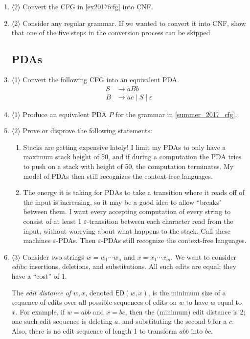 \documentclass[a4paper,american,12pt]{book}
\newcommand{\Level}[1]{{\color{blue} $\langle$#1$\rangle$}}
\begin{document}
\begin{enumerate}
\item \Level{2} Convert the CFG in \cref{ex2017fcfg} into CNF.

\item \Level{2} Consider any regular grammar. If we wanted to convert it into CNF, show that one of the five steps in the conversion process can be skipped.

\subsection{PDAs}

\item \label{ex2017fcfg} \Level{1}  Convert the following CFG into an equivalent PDA.
\begin{align*}
S &\to aBb\\
B &\to ac \;|\;S\;|\;\varepsilon
\end{align*}


\item \Level{1} Produce an equivalent PDA $P$ for the grammar in \cref{summer_2017_cfg}.

\item \Level{2} Prove or disprove the following statements:
\begin{enumerate}
	\item Stacks are getting expensive lately! I limit my PDAs to only have a maximum stack height of 50, and if during a computation the PDA tries to push on a stack with height of 50, the computation terminates. My model of PDAs then still recognizes the context-free languages.
	\item The energy it is taking for PDAs to take a transition where it reads off of the input is increasing, so it may be a good idea to allow ``breaks" between them. I want every accepting computation of every string to consist of at least 1 $\varepsilon$-transition between each character read from the input, without worrying about what happens to the stack. Call these machines $\varepsilon$-PDAs. Then $\varepsilon$-PDAs still recognize the context-free languages.
\end{enumerate}

\item \Level{3} Consider two strings $w = w_1 \cdots w_n$ and $x = x_1 \cdots x_m$. We want to consider \emph{edits}: insertions, deletions, and substitutions. All such edits are equal; they have a ``cost'' of 1.

The \emph{edit distance of $w, x$}, denoted ${\textsf{ED}}(w,x)$, is the minimum size of a sequence of edits over all possible sequences of edits on $w$ to have $w$ equal to $x$. For example, if $w = abb$ and $x = bc$, then the (minimum) edit distance is 2; one such edit sequence is deleting $a$, and substituting the second $b$ for a $c$. Also, there is no edit sequence of length 1 to transform $abb$ into $bc$.


\end{enumerate}
\end{document}
